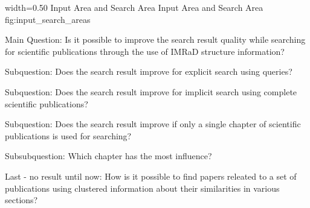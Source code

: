       {width=0.50\textwidth}
      {Input Area and Search Area}
      {Input Area and Search Area}
      {fig:input_search_areas}


Main Question: Is it possible to improve the search result quality while searching for scientific publications through the use of IMRaD structure information?

Subquestion: Does the search result improve for explicit search using queries?

Subquestion: Does the search result improve for implicit search using complete scientific publications?

Subquestion: Does the search result improve if only a single chapter of scientific publications is used for searching?

Subsubquestion: Which chapter has the most influence?

Last - no result until now: How is it possible to find papers releated to a set of publications using clustered information about their similarities in various sections?
